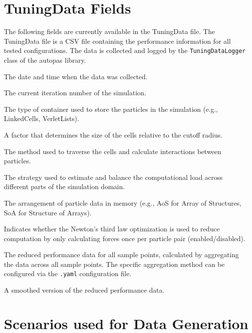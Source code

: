 \section{TuningData Fields}
\label{des:tuningdatafields}

The following fields are currently available in the TuningData file.
The TuningData file is a CSV file containing the performance information for all tested configurations. The data is collected and logged by the \texttt{TuningDataLogger} class of the \gls{autopas} library.

\begin{description}[style=multiline, leftmargin =40mm]
  \item[Date] The date and time when the data was collected.
  \item[Iteration] The current iteration number of the simulation.
  \item[Container] The type of container used to store the particles in the simulation (e.g., LinkedCells, VerletLists).
  \item[CellSizeFactor] A factor that determines the size of the cells relative to the cutoff radius.
  \item[Traversal] The method used to traverse the cells and calculate interactions between particles.
  \item[Load Estimator] The strategy used to estimate and balance the computational load across different parts of the simulation domain.
  \item[Data Layout] The arrangement of particle data in memory (e.g., AoS for Array of Structures, SoA for Structure of Arrays).
  \item[Newton 3] Indicates whether the Newton's third law optimization is used to reduce computation by only calculating forces once per particle pair (enabled/disabled).
  \item[Reduced] The reduced performance data for all sample points, calculated by aggregating the data across all sample points. The specific aggregation method can be configured via the \texttt{.yaml} configuration file.
  \item[Smoothed] A smoothed version of the reduced performance data.

\end{description}

\section{Scenarios used for Data Generation}
\label{des:scenarios}

